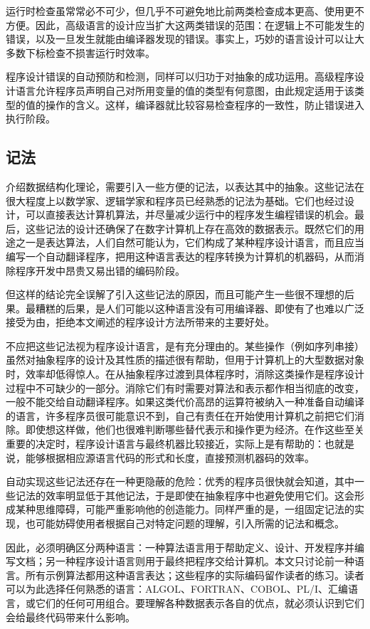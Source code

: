 \documentclass[twoside,11pt,fontset=none]{ctexbook}
\begin{document}
运行时检查虽常常必不可少，但几乎不可避免地比前两类检查成本更高、使用更不方便。因此，高级语言的设计应当扩大这两类错误的范围：在逻辑上不可能发生的错误，以及一旦发生就能由编译器发现的错误。事实上，巧妙的语言设计可以让大多数下标检查不损害运行时效率。

程序设计错误的自动预防和检测，同样可以归功于对抽象的成功运用。高级程序设计语言允许程序员声明自己对所用变量的值的类型有何意图，由此规定适用于该类型的值的操作的含义。这样，编译器就比较容易检查程序的一致性，防止错误进入执行阶段。

\subsection{记法}

介绍数据结构化理论，需要引入一些方便的记法，以表达其中的抽象。这些记法在很大程度上以数学家、逻辑学家和程序员已经熟悉的记法为基础。它们也经过设计，可以直接表达计算机算法，并尽量减少运行中的程序发生编程错误的机会。最后，这些记法的设计还确保了在数字计算机上存在高效的数据表示。既然它们的用途之一是表达算法，人们自然可能认为，它们构成了某种程序设计语言，而且应当编写一个自动翻译程序，把用这种语言表达的程序转换为计算机的机器码，从而消除程序开发中昂贵又易出错的编码阶段。

但这样的结论完全误解了引入这些记法的原因，而且可能产生一些很不理想的后果。最糟糕的后果，是人们可能以这种语言没有可用编译器、即使有了也难以广泛接受为由，拒绝本文阐述的程序设计方法所带来的主要好处。

不应把这些记法视为程序设计语言，是有充分理由的。某些操作（例如序列串接）虽然对抽象程序的设计及其性质的描述很有帮助，但用于计算机上的大型数据对象时，效率却低得惊人。在从抽象程序过渡到具体程序时，消除这类操作是程序设计过程中不可缺少的一部分。消除它们有时需要对算法和表示都作相当彻底的改变，一般不能交给自动翻译程序。如果这类代价高昂的运算符被纳入一种准备自动编译的语言，许多程序员很可能意识不到，自己有责任在开始使用计算机之前把它们消除。即使想这样做，他们也很难判断哪些替代表示和操作更为经济。在作这些至关重要的决定时，程序设计语言与最终机器比较接近，实际上是有帮助的：也就是说，能够根据相应源语言代码的形式和长度，直接预测机器码的效率。

自动实现这些记法还存在一种更隐蔽的危险：优秀的程序员很快就会知道，其中一些记法的效率明显低于其他记法，于是即使在抽象程序中也避免使用它们。这会形成某种思维障碍，可能严重影响他的创造能力。同样严重的是，一组固定记法的实现，也可能妨碍使用者根据自己对特定问题的理解，引入所需的记法和概念。

因此，必须明确区分两种语言：一种算法语言用于帮助定义、设计、开发程序并编写文档；另一种程序设计语言则用于最终把程序交给计算机。本文只讨论前一种语言。所有示例算法都用这种语言表达；这些程序的实际编码留作读者的练习。读者可以为此选择任何熟悉的语言：ALGOL、FORTRAN、COBOL、PL/I、汇编语言，或它们的任何可用组合。要理解各种数据表示各自的优点，就必须认识到它们会给最终代码带来什么影响。
\end{document}
